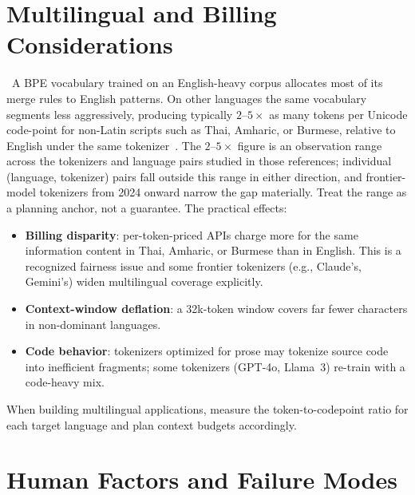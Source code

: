 \section{Multilingual and Billing Considerations}

\Emp~A BPE vocabulary trained on an English-heavy corpus allocates most of
its merge rules to English patterns. On other languages the same
vocabulary segments less aggressively, producing typically $2$--$5\times$
as many tokens per Unicode code-point for non-Latin scripts such as
Thai, Amharic, or Burmese, relative to English under the same
tokenizer~\citep{ahia2023languages,petrov2023language}. The $2$--$5\times$
figure is an observation range across the tokenizers and language pairs
studied in those references; individual (language, tokenizer) pairs
fall outside this range in either direction, and frontier-model
tokenizers from 2024 onward narrow the gap materially. Treat the range
as a planning anchor, not a guarantee. The practical effects:
\begin{itemize}
  \item \textbf{Billing disparity}: per-token-priced APIs charge more
        for the same information content in Thai, Amharic, or Burmese
        than in English. This is a recognized fairness issue and
        some frontier tokenizers (e.g., Claude's, Gemini's) widen
        multilingual coverage explicitly.
  \item \textbf{Context-window deflation}: a 32k-token window covers
        far fewer characters in non-dominant languages.
  \item \textbf{Code behavior}: tokenizers optimized for prose may
        tokenize source code into inefficient fragments; some
        tokenizers (GPT-4o, Llama~3) re-train with a code-heavy mix.
\end{itemize}
When building multilingual applications, measure the token-to-codepoint
ratio for each target language and plan context budgets accordingly.

\section{Human Factors and Failure Modes}
\label{sec:ch4_oov}

